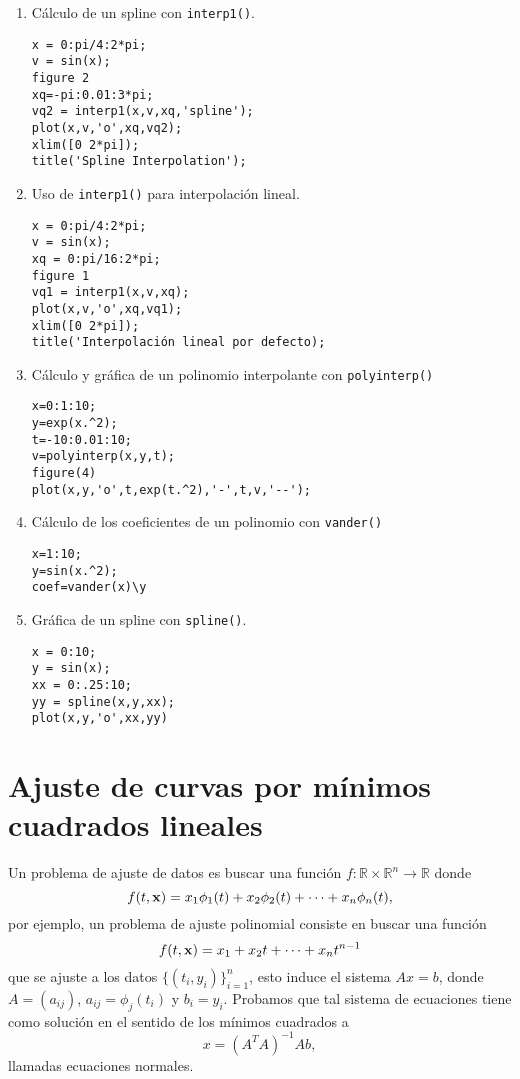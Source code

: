 \documentclass[12pt,letterpaper]{article}
\begin{document}
\begin{multicols}{2}
\begin{enumerate}
\item C\'alculo de un spline con \texttt{interp1()}.
\begin{verbatim}
x = 0:pi/4:2*pi;
v = sin(x);
figure 2
xq=-pi:0.01:3*pi;
vq2 = interp1(x,v,xq,'spline');
plot(x,v,'o',xq,vq2);
xlim([0 2*pi]);
title('Spline Interpolation');
\end{verbatim}

\item Uso de \texttt{interp1()} para interpolaci\'on lineal.
\begin{verbatim}
x = 0:pi/4:2*pi;
v = sin(x);
xq = 0:pi/16:2*pi;
figure 1 
vq1 = interp1(x,v,xq);
plot(x,v,'o',xq,vq1);
xlim([0 2*pi]);
title('Interpolación lineal por defecto);
\end{verbatim}

\item C\'alculo y gr\'afica de un polinomio interpolante con \texttt{polyinterp()}
\begin{verbatim}
x=0:1:10;
y=exp(x.^2);
t=-10:0.01:10;
v=polyinterp(x,y,t);
figure(4)
plot(x,y,'o',t,exp(t.^2),'-',t,v,'--');
\end{verbatim}

\item C\'alculo de los coeficientes de un polinomio con \texttt{vander()}
\begin{verbatim}
x=1:10;
y=sin(x.^2);
coef=vander(x)\y
\end{verbatim}

\item Gr\'afica de un spline con \texttt{spline()}.
\begin{verbatim}
x = 0:10;
y = sin(x);
xx = 0:.25:10;
yy = spline(x,y,xx);
plot(x,y,'o',xx,yy)
\end{verbatim}
\end{enumerate}
\end{multicols}



\section{Ajuste de curvas por m\'inimos cuadrados lineales}

Un problema de ajuste de datos es buscar una funci\'on $f:\mathbb{R}\times\mathbb{R}^n \rightarrow \mathbb{R}$ donde 
$$
f(t, {\bf x})=x_1\phi_1(t)+x_2\phi_2(t)+\cdots+x_n\phi_n(t),
$$
por ejemplo, un problema de ajuste polinomial consiste en buscar una funci\'on
$$
f(t,{\bf x}) =x_1+x_2t+ \cdots + x_n t^{n-1} 
$$
que se ajuste a los datos $\{(t_i,y_i)\}_{i=1}^n$, esto induce el sistema  $Ax=b$, donde $A=(a_{ij})$, $a_{ij}=\phi_j(t_i)$  y $b_i=y_i$. Probamos que tal sistema de ecuaciones tiene como soluci\'on en el sentido de los m\'inimos cuadrados a
$$
x=(A^TA)^{-1}Ab,
$$
llamadas ecuaciones normales.
\end{document}
